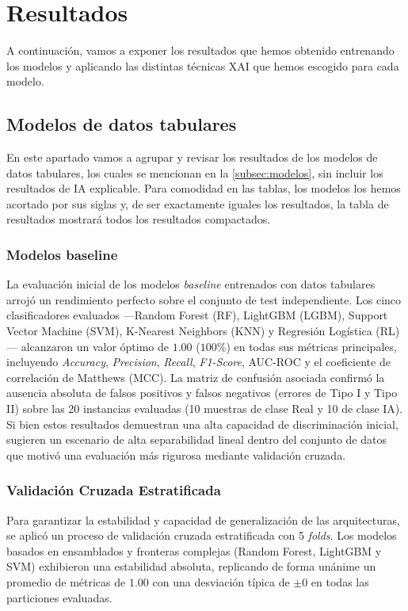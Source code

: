 \section{Resultados}
\label{sec:resultados}
A continuación, vamos a exponer los resultados que hemos obtenido entrenando los modelos y aplicando las distintas técnicas XAI que hemos escogido para cada modelo.
\subsection{Modelos de datos tabulares}

En este apartado vamos a agrupar y revisar los resultados de los modelos de datos tabulares, los cuales se mencionan en la \autoref{subsec:modelos}, sin incluir los resultados de IA explicable. Para comodidad en las tablas, los modelos los hemos acortado por sus siglas y, de ser exactamente iguales los resultados, la tabla de resultados mostrará todos los resultados compactados.

\subsubsection*{Modelos baseline}

La evaluación inicial de los modelos \textit{baseline} entrenados con datos tabulares arrojó un rendimiento perfecto sobre el conjunto de test independiente. Los cinco clasificadores evaluados —Random Forest (RF), LightGBM (LGBM), Support Vector Machine (SVM), K-Nearest Neighbors (KNN) y Regresión Logística (RL)— alcanzaron un valor óptimo de $1.00$ ($100\%$) en todas sus métricas principales, incluyendo \textit{Accuracy}, \textit{Precision}, \textit{Recall}, \textit{F1-Score}, AUC-ROC y el coeficiente de correlación de Matthews (MCC). La matriz de confusión asociada confirmó la ausencia absoluta de falsos positivos y falsos negativos (errores de Tipo I y Tipo II) sobre las 20 instancias evaluadas (10 muestras de clase Real y 10 de clase IA). Si bien estos resultados demuestran una alta capacidad de discriminación inicial, sugieren un escenario de alta separabilidad lineal dentro del conjunto de datos que motivó una evaluación más rigurosa mediante validación cruzada.

\subsubsection*{Validación Cruzada Estratificada}

Para garantizar la estabilidad y capacidad de generalización de las arquitecturas, se aplicó un proceso de validación cruzada estratificada con 5 \textit{folds}. Los modelos basados en ensamblados y fronteras complejas (Random Forest, LightGBM y SVM) exhibieron una estabilidad absoluta, replicando de forma unánime un promedio de métricas de $1.00$ con una desviación típica de $\pm 0$ en todas las particiones evaluadas.

